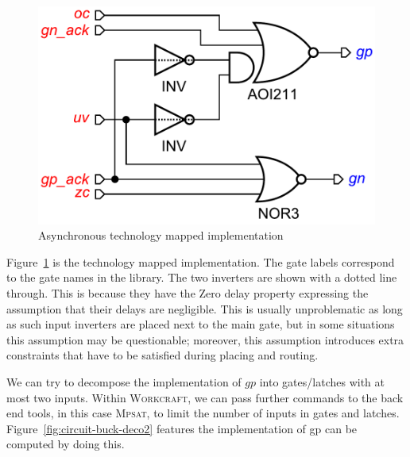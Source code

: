 \documentclass[british,compsoc]{IEEEtran}
\newcommand{\noun}[1]{\textsc{#1}}
\begin{document}
\begin{figure}[h]
\begin{centering}
\includegraphics[scale=0.3]{Images/circuit-buck-mapped-pfy-wc.pdf}
\par\end{centering}

\protect\caption{\label{fig:tech-mapped-circuit}Asynchronous technology mapped implementation}
\end{figure}

Figure~\ref{fig:tech-mapped-circuit} is the technology mapped implementation.  The gate labels correspond to the gate names in the library.
The two inverters are shown with a dotted line through. This is because they have the Zero delay property expressing the assumption that their delays are negligible.
This is usually unproblematic as long as such input inverters are placed next to the main gate, but in some situations this assumption may be questionable;
moreover, this assumption introduces extra constraints that have to be satisfied during placing and routing.

We can try to decompose the implementation of $gp$ into gates/latches with at most two inputs.
Within \noun{Workcraft}, we can pass further commands to the back end tools, in this case \noun{Mpsat}, to limit the number of inputs in gates and latches.
Figure~\ref{fig:circuit-buck-deco2} features the implementation of gp can be computed by doing this.
\end{document}
